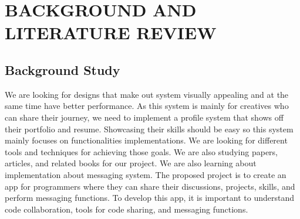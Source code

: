 \chapter{BACKGROUND AND LITERATURE REVIEW}





\section{Background Study}

We are looking for designs that make out system visually appealing and at the same time have better performance. As this system is mainly for creatives who can share their journey, we need to implement a profile system that shows off their portfolio and resume. Showcasing their skills should be easy so this system mainly focuses on functionalities implementations. We are looking for different tools and techniques for achieving those goals. We are also studying papers, articles, and related books for our project. We are also learning about implementation about messaging system.
The proposed project is to create an app for programmers where they can share their discussions, projects, skills, and perform messaging functions. To develop this app, it is important to understand code collaboration, tools for code sharing, and messaging functions.

